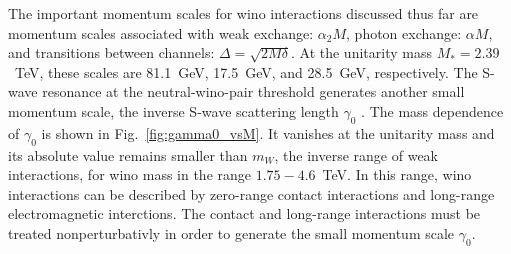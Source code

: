 \documentclass[%
 reprint,
 amsmath,amssymb,
 aps,
]{revtex4-1}
\begin{document}
The important momentum scales for wino interactions discussed thus far are momentum scales associated with weak exchange: $\alpha_2M$, photon exchange: $\alpha M$, and transitions between channels: $\Delta = \sqrt{2M\delta}$.
At the unitarity mass $M_*=2.39$~TeV, these scales are 81.1~GeV, 17.5~GeV, and 28.5~GeV, respectively.
The S-wave resonance at the neutral-wino-pair threshold generates another small momentum scale, the inverse S-wave scattering length $\gamma_0$ \cite{Braaten:2004rn}.
The mass dependence of $\gamma_0$ is shown in Fig.~\ref{fig:gamma0_vsM}.
It vanishes at the unitarity mass and its absolute value remains smaller than $m_W$, the inverse range of weak interactions, for wino mass in the range $1.75-4.6$~TeV.
In this range, wino interactions can be described by zero-range contact interactions and long-range electromagnetic interctions.
The contact and long-range interactions must be treated nonperturbativly in order to generate the small momentum scale $\gamma_0$.
\end{document}
